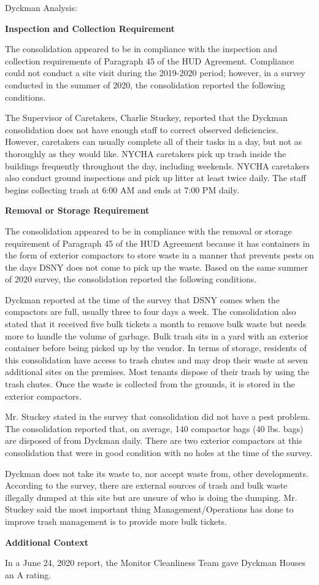 Dyckman Analysis: 

\textbf{Inspection and Collection Requirement} 

 

The consolidation appeared to be in compliance with the inspection and collection requirements of Paragraph 45 of the HUD Agreement. Compliance could not conduct a site visit during the 2019-2020 period; however, in a survey conducted in the summer of 2020, the consolidation reported the following conditions.

The Supervisor of Caretakers, Charlie Stuckey, reported that the Dyckman consolidation does not have enough staff to correct observed deficiencies. However, caretakers can usually complete all of their tasks in a day, but not as thoroughly as they would like. NYCHA caretakers pick up trash inside the buildings frequently throughout the day, including weekends. NYCHA caretakers also conduct ground inspections and pick up litter at least twice daily. The staff begins collecting trash at 6:00 AM and ends at 7:00 PM daily.

\textbf{Removal or Storage Requirement} 

The consolidation appeared to be in compliance with the removal or storage requirement of Paragraph  45 of the HUD Agreement because it has containers in the form of exterior compactors to store waste in a manner that prevents pests on the days DSNY does not come to pick up the waste. Based on the same summer of  2020  survey, the consolidation reported the following conditions.

  

Dyckman reported at the time of the survey that DSNY comes when the compactors are full, usually three to four days a week. The consolidation also stated that it received five bulk tickets a month to remove bulk waste but needs more to handle the volume of garbage. Bulk trash sits in a yard with an exterior container before being picked up by the vendor. In terms of storage, residents of this consolidation have access to trash chutes and may drop their waste at seven additional sites on the premises.  Most tenants dispose of their trash by using the trash chutes. Once the waste is collected from the grounds, it is stored in the exterior compactors.  

 

Mr. Stuckey stated in the survey that consolidation did not have a pest problem. The consolidation reported that, on average, 140 compactor bags (40 lbs. bags)  are disposed of from Dyckman daily. There are two exterior compactors at this consolidation that were in good condition with no holes at the time of the survey. 

Dyckman does not take its waste to, nor accept waste from, other developments. According to the survey, there are external sources of trash and bulk waste illegally dumped at this site but are unsure of who is doing the dumping. Mr. Stuckey said the most important thing Management/Operations has done to improve trash management is to provide more bulk tickets.

\textbf{Additional Context}  

In a June 24, 2020 report, the Monitor Cleanliness Team gave Dyckman Houses an A rating.  

 
